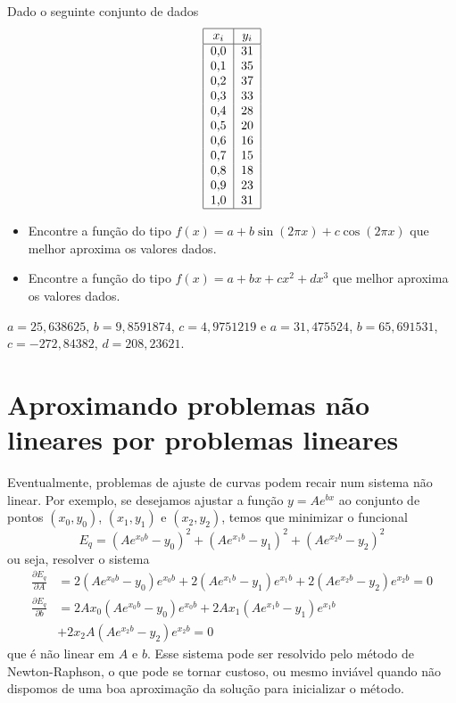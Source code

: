 \begin{Exercise} Dado o seguinte conjunto de dados
  \begin{equation*}
    \begin{tabular}{|c|c|}
      \hline
      $x_i$ & $y_i$\\
      \hline
      0,0 &  31\\
      0,1 &  35\\
      0,2 &  37\\
      0,3 &  33\\
      0,4 &  28\\
      0,5 &  20\\
      0,6 &  16\\
      0,7 &  15\\
      0,8 &  18\\
      0,9 &  23\\
      1,0 &  31\\
      \hline
    \end{tabular}    
  \end{equation*}
\begin{itemize}
\item Encontre a função do tipo $f(x)=a+b\sin(2\pi x)+c\cos(2\pi x)$ que melhor aproxima os valores dados.
\item Encontre a função do tipo $f(x)=a+bx+cx^2+dx^3$ que melhor aproxima os valores dados.
\end{itemize}
\end{Exercise}
\begin{Answer}
  \begin{tiny}
      $a=25,638625$, $b=9,8591874$, $c=4,9751219$ e   $a=31,475524$, $b=65,691531$, $c=-272,84382$, $d=208,23621$.
  \end{tiny}
\end{Answer}

\section{Aproximando problemas não lineares por problemas lineares}

Eventualmente, problemas de ajuste de curvas podem recair num sistema não linear. Por exemplo, se desejamos ajustar a função $y=Ae^{bx}$ ao conjunto de pontos $(x_0,y_0)$, $(x_1,y_1)$ e $(x_2,y_2)$, temos que minimizar o funcional
$$
E_q=(Ae^{x_0b}-y_0)^2+(Ae^{x_1b}-y_1)^2+(Ae^{x_2b}-y_2)^2
$$
ou seja, resolver o sistema
\begin{align*}
\frac{\partial E_q}{\partial A} &= 2(Ae^{x_0b}-y_0)e^{x_0b}+2(Ae^{x_1b}-y_1)e^{x_1b}+2(Ae^{x_2b}-y_2)e^{x_2b}=0\\
\frac{\partial E_q}{\partial b} &= 2Ax_0(Ae^{x_0b}-y_0)e^{x_0b} + 2Ax_1(Ae^{x_1b}-y_1)e^{x_1b} \\
&+ 2x_2A(Ae^{x_2b}-y_2)e^{x_2b}=0
\end{align*}
que é não linear em $A$ e $b$. Esse sistema pode ser resolvido pelo método de Newton-Raphson, o que pode se tornar custoso, ou mesmo inviável quando não dispomos de uma boa aproximação da solução para inicializar o método.

